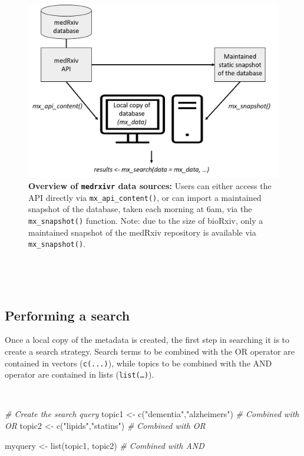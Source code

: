\documentclass[a4paper, twoside]{templates/ociamthesis}
\newenvironment{Shaded}{\begin{snugshade}}{\end{snugshade}}
\newcommand{\CommentTok}[1]{\textcolor[rgb]{0.56,0.35,0.01}{\textit{#1}}}
\newcommand{\FunctionTok}[1]{\textcolor[rgb]{0.00,0.00,0.00}{#1}}
\newcommand{\NormalTok}[1]{#1}
\newcommand{\OtherTok}[1]{\textcolor[rgb]{0.56,0.35,0.01}{#1}}
\newcommand{\StringTok}[1]{\textcolor[rgb]{0.31,0.60,0.02}{#1}}
\renewenvironment{Shaded}
{
  \vspace{4pt}%
  \begin{snugshade}%
}{%
  \end{snugshade}%
  \vspace{4pt}%
}
\begin{document}
\begin{figure}[H]
\includegraphics[width=1\linewidth]{figures/sys-rev-tools/data_sources} \caption[Overview of \texttt{medrxivr} data sources]{\textbf{Overview of \texttt{medrxivr} data sources:} Users can either access the API directly via \texttt{mx\_api\_content()}, or can import a maintained snapshot of the database, taken each morning at 6am, via the \texttt{mx\_snapshot()} function. Note: due to the size of bioRxiv, only a maintained snapshot of the medRxiv repository is available via \texttt{mx\_snapshot()}.}\label{fig:medrxivr-data-sources}
\end{figure}

~

~

\hypertarget{performing-a-search}{%
\subsection{Performing a search}\label{performing-a-search}}

Once a local copy of the metadata is created, the first step in searching it is to create a search strategy. Search terms to be combined with the OR operator are contained in vectors (\texttt{c(...)}), while topics to be combined with the AND operator are contained in lists (\texttt{list(\ldots{})}).

~

\begin{Shaded}
\begin{Highlighting}[]
\CommentTok{\# Create the search query}
\NormalTok{topic1  }\OtherTok{\textless{}{-}} \FunctionTok{c}\NormalTok{(}\StringTok{"dementia"}\NormalTok{,}\StringTok{"alzheimer\textquotesingle{}s"}\NormalTok{)  }\CommentTok{\# Combined with OR}
\NormalTok{topic2  }\OtherTok{\textless{}{-}} \FunctionTok{c}\NormalTok{(}\StringTok{"lipids"}\NormalTok{,}\StringTok{"statins"}\NormalTok{)        }\CommentTok{\# Combined with OR}

\NormalTok{myquery }\OtherTok{\textless{}{-}} \FunctionTok{list}\NormalTok{(topic1, topic2)         }\CommentTok{\# Combined with AND}
\end{Highlighting}
\end{Shaded}
\end{document}

